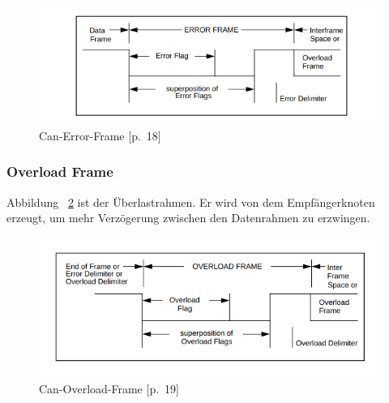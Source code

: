  \begin{figure}[h]
 	\begin{center}
 	  \includegraphics[width=1\textwidth]{./images/Can-error-frame.jpg}
 	\end{center}
 	\vspace{-5pt}
 	\caption[Can-Error-Frame]{Can-Error-Frame \cite{Bosch1991}[p.~18]} %
 	\label{fig:can-error-frame}
 	\vspace{-5pt}
 \end{figure}

\subsubsection{Overload Frame}
 Abbildung ~\ref{fig:can-overload-frame} ist der Überlastrahmen. Er wird von dem Empfängerknoten erzeugt, um mehr Verzögerung zwischen den Datenrahmen zu erzwingen.

\begin{figure}[h]
	\begin{center}
		\includegraphics[width=1\textwidth]{./images/Can-overload-frame.jpg}
	\end{center}
	\vspace{-5pt}
	\caption[Can-Overload-Frame]{Can-Overload-Frame \cite{Bosch1991}[p.~19]} %
	\label{fig:can-overload-frame}
	\vspace{-5pt}
\end{figure}




